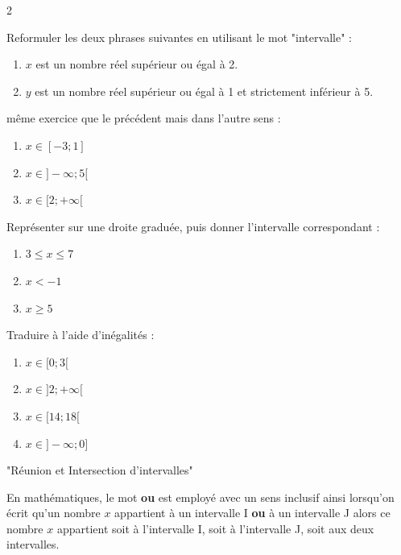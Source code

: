 \begin{multicols}{2}

\exo 

Reformuler les deux phrases suivantes en utilisant le mot "intervalle" :
\begin{enumerate}
\item $x$ est un nombre réel supérieur ou égal à 2.
\item $y$ est un nombre réel supérieur ou égal à 1 et strictement inférieur à 5.
\end{enumerate}

\medskip

\exo 

même exercice que le précédent mais dans l'autre sens :
\begin{enumerate}
\item $x \in [-3 ; 1]$
\item $ x \in ]-\infty ; 5[$
\item $ x \in [2 ; +\infty[$
\end{enumerate}

\medskip

\exo 

Représenter sur une droite graduée, puis donner l'intervalle correspondant :
\begin{enumerate}
\item $3 \leqslant x \leqslant 7$
\item $ x <-1$
\item $x \geqslant 5$
\end{enumerate}

\medskip

\exo 

Traduire à l'aide d'inégalités :
\begin{enumerate}
\item $x \in [0 ; 3[$
\item $x \in ]2 ; +\infty [$
\item $x \in [ 14 ; 18 [$
\item $x \in ]-\infty ; 0]$
\end{enumerate}
\end{multicols}

\medskip

\exo "Réunion et Intersection d'intervalles"

En mathématiques, le mot \textbf{ou} est employé avec un sens inclusif ainsi lorsqu'on écrit qu'un nombre $x$ appartient à un intervalle I \textbf{ou} à un intervalle J alors ce nombre $x$ appartient soit à l'intervalle I, soit à l'intervalle J, soit aux deux intervalles.

